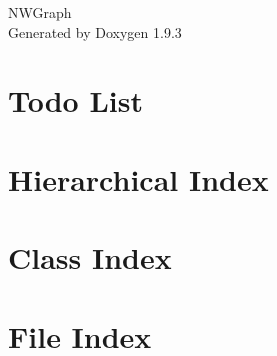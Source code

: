 \documentclass[twoside]{book}
\newcommand{\+}{\discretionary{\mbox{\scriptsize$\hookleftarrow$}}{}{}}
\newcommand{\clearemptydoublepage}{%
    \newpage{\pagestyle{empty}\cleardoublepage}%
  }
\begin{document}
  \raggedbottom
    \hypersetup{pageanchor=false,
                bookmarksnumbered=true,
                pdfencoding=unicode
               }
  \begin{titlepage}
  \vspace*{7cm}
  \begin{center}%
  {\Large NWGraph}\\
  \vspace*{1cm}
  {\large Generated by Doxygen 1.9.3}\\
  \end{center}
  \end{titlepage}
  \clearemptydoublepage
  \tableofcontents
  \clearemptydoublepage
  \hypersetup{pageanchor=true}
\chapter{Todo List}
\label{todo}

\chapter{Hierarchical Index}

\chapter{Class Index}

\chapter{File Index}

\end{document}
